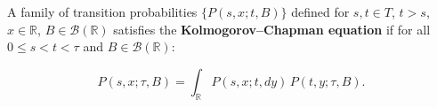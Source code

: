 A family of transition probabilities $\{P(s, x; t, B)\}$ defined for $s, t \in T$, $t > s$, $x \in \mathbb{R}$, $B \in \mathcal{B}(\mathbb{R})$ satisfies the \textbf{Kolmogorov–Chapman equation} if for all $0 \leq s < t < \tau$ and $B \in \mathcal{B}(\mathbb{R})$:

$$P(s, x; \tau, B) = \int_{\mathbb{R}} P(s, x; t, dy) \, P(t, y; \tau, B).$$
